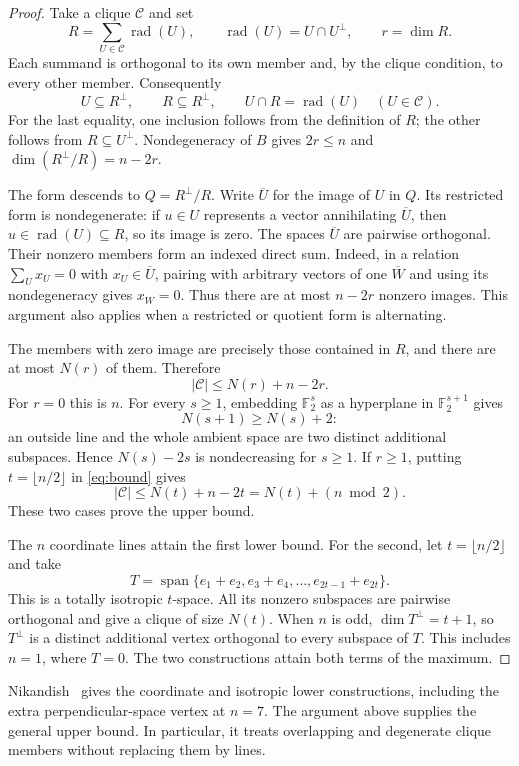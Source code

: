 \documentclass[11pt]{article}
\newcommand{\F}{\mathbb F_2}
\DeclareMathOperator{\rad}{rad}
\begin{document}
\begin{proof}
Take a clique $\mathcal C$ and set
\[
 R=\sum_{U\in\mathcal C}\rad(U),\qquad
 \rad(U)=U\cap U^\perp,\qquad r=\dim R.
\]
Each summand is orthogonal to its own member and, by the clique condition,
to every other member. Consequently
\[
 U\subseteq R^\perp,\qquad R\subseteq R^\perp,\qquad
 U\cap R=\rad(U)\quad(U\in\mathcal C).
\]
For the last equality, one inclusion follows from the definition of $R$;
the other follows from $R\subseteq U^\perp$. Nondegeneracy of $B$ gives
$2r\le n$ and $\dim(R^\perp/R)=n-2r$.

The form descends to $Q=R^\perp/R$. Write $\overline U$ for the image of
$U$ in $Q$. Its restricted form is nondegenerate: if $u\in U$ represents
a vector annihilating $\overline U$, then $u\in\rad(U)\subseteq R$, so
its image is zero. The spaces $\overline U$ are pairwise orthogonal.
Their nonzero members form an indexed direct sum. Indeed, in a relation
$\sum_U x_U=0$ with $x_U\in\overline U$, pairing with arbitrary vectors
of one $\overline W$ and using its nondegeneracy gives $x_W=0$.
Thus there are at most $n-2r$ nonzero images. This argument also applies
when a restricted or quotient form is alternating.

The members with zero image are precisely those contained in $R$, and
there are at most $N(r)$ of them. Therefore
\begin{equation}\label{eq:bound}
 |\mathcal C|\le N(r)+n-2r.
\end{equation}
For $r=0$ this is $n$. For every $s\ge1$, embedding $\F^s$ as a hyperplane
in $\F^{s+1}$ gives
\[
 N(s+1)\ge N(s)+2:
\]
an outside line and the whole ambient space are two distinct additional
subspaces. Hence $N(s)-2s$ is nondecreasing for $s\ge1$. If $r\ge1$,
putting $t=\lfloor n/2\rfloor$ in \eqref{eq:bound} gives
\[
 |\mathcal C|\le N(t)+n-2t=N(t)+(n\bmod2).
\]
These two cases prove the upper bound.

The $n$ coordinate lines attain the first lower bound. For the second,
let $t=\lfloor n/2\rfloor$ and take
\[
 T=\operatorname{span}\{e_1+e_2,e_3+e_4,\ldots,e_{2t-1}+e_{2t}\}.
\]
This is a totally isotropic $t$-space. All its nonzero subspaces are
pairwise orthogonal and give a clique of size $N(t)$. When $n$ is odd,
$\dim T^\perp=t+1$, so $T^\perp$ is a distinct additional vertex
orthogonal to every subspace of $T$. This includes $n=1$, where $T=0$.
The two constructions attain both terms of the maximum.
\end{proof}

Nikandish~\cite{N} gives the coordinate and isotropic lower constructions,
including the extra perpendicular-space vertex at $n=7$. The argument
above supplies the general upper bound. In particular, it treats
overlapping and degenerate clique members without replacing them by lines.
\end{document}
